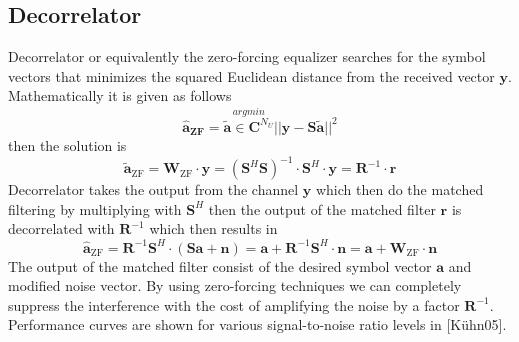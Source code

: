 \subsection{Decorrelator}
Decorrelator or equivalently the zero-forcing equalizer searches for the symbol vectors that minimizes the squared Euclidean distance from the received vector $\mathrm{\mathbf{y}}$. Mathematically it is given as follows
\begin{equation}
\mathrm{\mathbf{\hat{a}_{ZF}}}=\stackrel{argmin}{\mathrm{\mathbf{\tilde{a}}}\in\mathrm{\mathbf{C}}^{N_U}}\vert\vert\mathrm{\mathbf{y}}-\mathrm{\mathbf{S}}\mathrm{\mathbf{\tilde{a}}}\vert\vert^2
\end{equation}
then the solution is
\begin{equation}
\mathrm{\mathbf{\tilde{a}}_{ZF}}=\mathrm{\mathbf{W}_{ZF}} \cdot \mathrm{\mathbf{y}} = (\mathrm{\mathbf{S}}^H\mathrm{\mathbf{S}})^{-1} \cdot \mathrm{\mathbf{S}}^H\cdot\mathrm{\mathbf{y}}=\mathrm{\mathbf{R}}^{-1}\cdot\mathrm{\mathbf{r}}
\end{equation}
Decorrelator takes the output from the channel $\mathrm{\mathbf{y}}$ which then do the matched filtering by multiplying with $\mathrm{\mathbf{S}}^H$ then the output of the matched filter $\mathrm{\mathbf{r}}$ is decorrelated with $\mathrm{\mathbf{R}}^{-1}$ which then results in
\begin{equation}
\mathrm{\mathbf{\hat{a}}_{ZF}}=\mathrm{\mathbf{R}}^{-1}\mathrm{\mathbf{S}}^H\cdot(\mathrm{\mathbf{S}}\mathrm{\mathbf{a}}+\mathrm{\mathbf{n}})=\mathrm{\mathbf{a}}+\mathrm{\mathbf{R}}^{-1}\mathrm{\mathbf{S}}^H\cdot\mathrm{\mathbf{n}}=\mathrm{\mathbf{a}}+\mathrm{\mathbf{W}_{ZF}}\cdot\mathrm{\mathbf{n}}
\end{equation}
The output of the matched filter consist of the desired symbol vector $\mathrm{\mathbf{a}}$ and modified noise vector. By using zero-forcing techniques we can completely suppress the interference with the cost of amplifying the noise by a factor $\mathrm{\mathbf{R}}^{-1}$. Performance curves are shown for various signal-to-noise ratio levels in [K\"uhn05].
